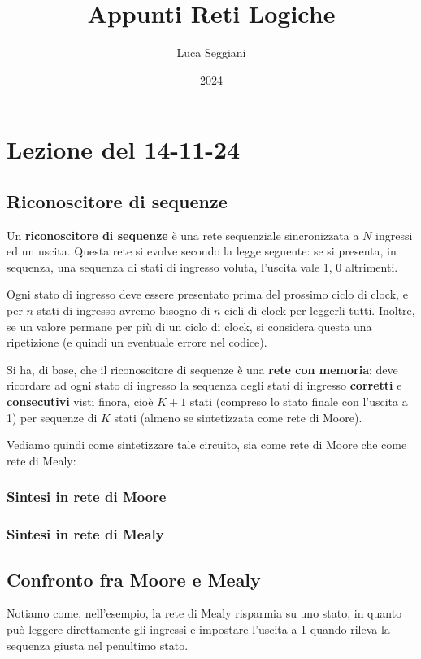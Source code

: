 \documentclass[a4paper,11pt]{article}
\title{Appunti Reti Logiche}
\author{Luca Seggiani}
\date{2024}
\begin{document}
\section{Lezione del 14-11-24}

\thispagestyle{empty}
\pagestyle{fancy}

\subsection{Riconoscitore di sequenze}
Un \textbf{riconoscitore di sequenze} è una rete sequenziale sincronizzata a $N$ ingressi ed un uscita.
Questa rete si evolve secondo la legge seguente: se si presenta, in sequenza, una sequenza di stati di ingresso voluta, l'uscita vale 1, 0 altrimenti.

Ogni stato di ingresso deve essere presentato prima del prossimo ciclo di clock, e per $n$ stati di ingresso avremo bisogno di $n$ cicli di clock per leggerli tutti.
Inoltre, se un valore permane per più di un ciclo di clock, si considera questa una ripetizione (e quindi un eventuale errore nel codice).

Si ha, di base, che il riconoscitore di sequenze è una \textbf{rete con memoria}: deve ricordare ad ogni stato di ingresso la sequenza degli stati di ingresso \textbf{corretti} e \textbf{consecutivi} visti finora, cioè $K + 1$ stati (compreso lo stato finale con l'uscita a 1) per sequenze di $K$ stati (almeno se sintetizzata come rete di Moore).

Vediamo quindi come sintetizzare tale circuito, sia come rete di Moore che come rete di Mealy:

\subsubsection{Sintesi in rete di Moore}


\subsubsection{Sintesi in rete di Mealy}


\subsection{Confronto fra Moore e Mealy}
Notiamo come, nell'esempio, la rete di Mealy risparmia su uno stato, in quanto può leggere direttamente gli ingressi e impostare l'uscita a 1 quando rileva la sequenza giusta nel penultimo stato.
\end{document}
